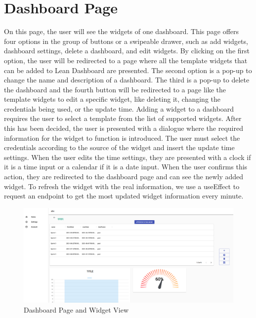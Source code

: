 \documentclass[a4paper,twoside,10pt]{report}
\begin{document}
\newpage
\section{Dashboard Page}
On this page, the user will see the widgets of one dashboard. This page offers four options in the group of buttons or a swipeable drawer, such as add widgets, dashboard settings, delete a dashboard, and edit widgets.
By clicking on the first option, the user will be redirected to a page where all the template widgets that can be added to Lean Dashboard are presented.
The second option is a pop-up to change the name and description of a dashboard.
The third is a pop-up to delete the dashboard and the fourth button will be redirected to a page like the template widgets to edit a specific widget, like deleting it, changing the credentials being used, or the update time.
\newline
Adding a widget to a dashboard requires the user to select a template from the list of supported widgets. After this has been decided, the user is presented with a dialogue where the required information for the widget to function is introduced. The user must select the credentials according to the source of the widget and insert the update time settings. When the user edits the time settings, they are presented with a clock if it is a time input or a calendar if it is a date input. When the user confirms this action, they are redirected to the dashboard page and can see the newly added widget. To refresh the widget with the real information, we use a useEffect to request an endpoint to get the most updated widget information every minute.

\begin{figure}[h!]
\center
  \includegraphics[width=\textwidth]{dashboardPage.png}
\caption{Dashboard Page and Widget View}
\end{figure}
\end{document}
